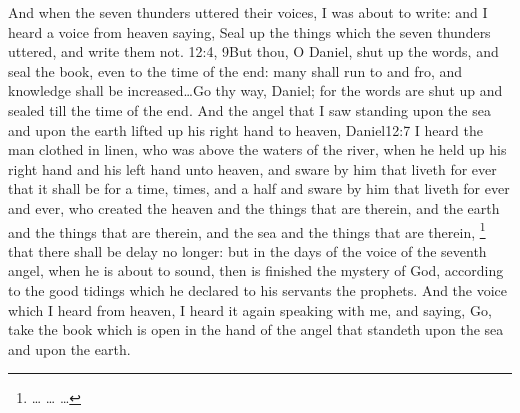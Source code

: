 And when the seven thunders uttered their voices, I was about to write: and I heard a voice from heaven saying, Seal up the things which the seven thunders uttered, and write them not.%
					{12:4, 9}{But thou, O Daniel, shut up the words, and seal the book, even to the time of the end: many shall run to and fro, and knowledge shall be increased\ldots Go thy way, Daniel; for the words are shut up and sealed till the time of the end.}
And the angel that I saw standing upon the sea and upon the earth lifted up his right hand to heaven,%
					{Daniel}{12:7}{ I heard the man clothed in linen, who was above the waters of the river, when he held up his right hand and his left hand unto heaven, and sware by him that liveth for ever that it shall be for a time, times, and a half}
and sware by him that liveth for ever and ever, who created the heaven and the things that are therein, and the earth and the things that are therein, and the sea and the things that are therein,%
	\footnote{%
		\ldots%
		\ldots%
		\ldots%
	}
 that there shall be delay no longer: 
but in the days of the voice of the seventh angel, when he is about to sound, then is finished the mystery of God, according to the good tidings which he declared to his servants the prophets. 
And the voice which I heard from heaven, I heard it again speaking with me, and saying, Go, take the book which is open in the hand of the angel that standeth upon the sea and upon the earth. 
